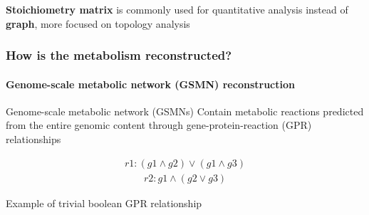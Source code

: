 \documentclass[8pt,usenames,dvipsnames]{beamer}
\begin{document}
\begin{frame}
{\begin{minipage}{0.5\textwidth}
\begin{tikzpicture}
\end{tikzpicture}

\end{minipage}

\begin{block}{}
\textbf{Stoichiometry matrix} is commonly used for quantitative analysis instead of \textbf{graph}, more focused on topology analysis
\end{block}


}


 \end{frame}

\begin{frame}
\frametitle{How is the metabolism reconstructed?}
\framesubtitle{Genome-scale metabolic network (GSMN) reconstruction}
\vspace{-0.3cm}
\begin{exampleblock}{Genome-scale metabolic network (GSMNs)}
Contain metabolic reactions predicted from the entire genomic content through gene-protein-reaction (GPR) relationships \tiny \citep{Thiele.2010}
\end{exampleblock}
\begin{minipage}{0.3\textwidth}
\begin{align*}
    r1 : (g1 \land g2) \lor (g1 \land g3)
\end{align*}
\begin{align*}
    r2 : g1 \land (g2 \lor g3)
\end{align*}

Example of trivial boolean GPR relationship


\end{minipage}
\end{frame}
\end{document}
